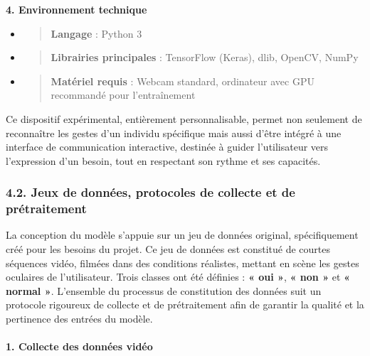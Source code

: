 \documentclass[
]{article}
\begin{document}
\textbf{4. Environnement technique}

\begin{itemize}
\item
  \begin{quote}
  \textbf{Langage} : Python 3
  \end{quote}
\item
  \begin{quote}
  \textbf{Librairies principales} : TensorFlow (Keras), dlib, OpenCV, NumPy
  \end{quote}
\item
  \begin{quote}
  \textbf{Matériel requis} : Webcam standard, ordinateur avec GPU recommandé pour l'entraînement
  \end{quote}
\end{itemize}

Ce dispositif expérimental, entièrement personnalisable, permet non seulement de reconnaître les gestes d'un individu spécifique mais aussi d'être intégré à une interface de communication interactive, destinée à guider l'utilisateur vers l'expression d'un besoin, tout en respectant son rythme et ses capacités.

\hypertarget{jeux-de-donnuxe9es-protocoles-de-collecte-et-de-pruxe9traitement}{%
\subsubsection{4.2. Jeux de données, protocoles de collecte et de prétraitement}\label{jeux-de-donnuxe9es-protocoles-de-collecte-et-de-pruxe9traitement}}

La conception du modèle s'appuie sur un jeu de données original, spécifiquement créé pour les besoins du projet. Ce jeu de données est constitué de courtes séquences vidéo, filmées dans des conditions réalistes, mettant en scène les gestes oculaires de l'utilisateur. Trois classes ont été définies : \textbf{« oui »}, \textbf{« non »} et \textbf{« normal »}. L'ensemble du processus de constitution des données suit un protocole rigoureux de collecte et de prétraitement afin de garantir la qualité et la pertinence des entrées du modèle.

\hypertarget{collecte-des-donnuxe9es-viduxe9o}{%
\paragraph{\texorpdfstring{\textbf{1. Collecte des données vidéo}}{1. Collecte des données vidéo}}\label{collecte-des-donnuxe9es-viduxe9o}}
\end{document}
